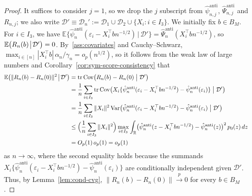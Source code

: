 \documentclass[a4paper]{article}
\newcommand{\R}{\mathbb{R}}
\newcommand{\E}{\mathbb{E}}
\newcommand{\norm}[1]{\|{#1}\|}
\newcommand{\cvp}{\overset{p}{\to}}
\DeclareMathOperator\Var{Var}
\DeclareMathOperator\Cov{Cov}
\DeclareMathOperator\tr{tr}
\theoremstyle{definition}
\begin{document}
\begin{proof}
It suffices to consider $j = 1$, so we drop the $j$ subscript from $\hat{\psi}_{n,j}^{\mathrm{anti}}$, $\hat{\Psi}_{n,j}^{\mathrm{anti}}$ and $R_{n,j}$; we also write $\mathcal{D}' \equiv \mathcal{D}_n' := \mathcal{D}_1 \cup \mathcal{D}_2 \cup \{X_i : i \in I_3\}$.  We initially fix $b \in B_M$. For $i \in I_3$, we have $\E\bigl\{\hat{\psi}_n^{\mathrm{anti}}(\varepsilon_i - X_i^\top bn^{-1/2})\,|\,\mathcal{D}'\bigr\} = \hat{\Psi}_n^{\mathrm{anti}}(X_i^\top bn^{-1/2})$, so $\E\bigl(R_n(b)\!\bigm|\!\mathcal{D}'\bigr) = 0$. By~\ref{ass:covariates} and Cauchy--Schwarz, $\max_{i \in [n]}|X_i^\top b|\,\alpha_n/\gamma_n = o_p(n^{1/2})$, so it follows from the weak law of large numbers and Corollary~\ref{cor:sym-score-consistency} that
\begin{align}
\E\bigl(\norm{R_n(b) - R_n(0)}^2 \!\bigm|\! \mathcal{D}'\bigr) &= \tr\Cov\bigl(R_n(b) - R_n(0) \bigm| \mathcal{D}'\bigr) \notag \\
&= \frac{1}{n}\sum_{i \in I_3} \tr\Cov\bigl(X_i\{\hat{\psi}_n^{\mathrm{anti}}(\varepsilon_i - X_i^\top bn^{-1/2}) - \hat{\psi}_n^{\mathrm{anti}}(\varepsilon_i)\} \bigm| \mathcal{D}'\bigr) \notag \\
&= \frac{1}{n}\sum_{i \in I_3} \norm{X_i}^2 \Var\bigl(\hat{\psi}_n^{\mathrm{anti}}(\varepsilon_i - X_i^\top bn^{-1/2}) - \hat{\psi}_n^{\mathrm{anti}}(\varepsilon_i) \bigm| \mathcal{D}'\bigr) \notag  \\
&\leq \Bigl(\frac{1}{n}\sum_{i \in I_3} \norm{X_i}^2\Bigr) \max_{i \in I_3}\int_\R \bigl(\hat{\psi}_n^{\mathrm{anti}}(z - X_i^\top bn^{-1/2}) - \hat{\psi}_n^{\mathrm{anti}}(z)\bigr)^2\,p_0(z)\,dz \notag \\
\label{eq:cov-Rn-beta}
&= O_p(1)\,o_p(1) = o_p(1)
\end{align}
as $n \to \infty$, where the second equality holds because the summands $X_i \{\hat{\psi}_n^{\mathrm{anti}}(\varepsilon_i - X_i^\top bn^{-1/2}) - \hat{\psi}_n^{\mathrm{anti}}(\varepsilon_i)\}$ are conditionally independent given $\mathcal{D}'$. Thus, by Lemma~\ref{lem:cond-cvg}, $\norm{R_n(b) - R_n(0)} \cvp 0$ for every $b \in B_M$.


\end{proof}
\end{document}
